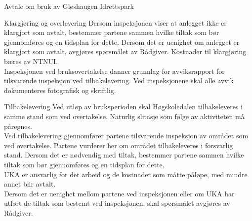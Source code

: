 \begin{instruks*}{Avtale om bruk av Gløshaugen Idrettspark}
\begin{instruksledd}{Klargjøring og overlevering}
Dersom inspeksjonen viser at anlegget ikke er klargjort som avtalt, bestemmer partene sammen hvilke tiltak som bør gjennomføres og en tidsplan for dette. Dersom det er uenighet om anlegget er klargjort som avtalt, avgjøres spørsmålet av Rådgiver. Kostnader til klargjøring bæres av NTNUI.\\

Inspeksjonen ved bruksovertakelse danner grunnlag for avviksrapport for tilsvarende inspeksjon ved tilbakelevering.  Ved inspeksjonene skal alle avvik dokumenteres fotografisk og skriftlig.\\
\end{instruksledd}

\begin{instruksledd}{Tilbakelevering}
Ved utløp av bruksperioden skal Høgskoledalen tilbakeleveres i samme stand som ved overtakelse.  Naturlig slitasje som følge av aktiviteten må påregnes.\\  

Ved tilbakelevering gjennomfører partene tilsvarende inspeksjon av området som ved overtakelse.  Partene vurderer her om området tilbakeleveres i forsvarlig stand.  Dersom det er nødvendig med tiltak, bestemmer partene sammen hvilke tiltak som bør gjennomføres og en tidsplan for dette.\\  

UKA er ansvarlig for det arbeid og de kostnader som måtte påløpe, med mindre annet blir avtalt.\\ 

Dersom det er uenighet mellom partene ved inspeksjonen eller om UKA har utført de tiltak som bestemt ved inspeksjonen, skal spørsmålet avgjøres av Rådgiver.\\
\end{instruksledd}

\end{instruks*}
